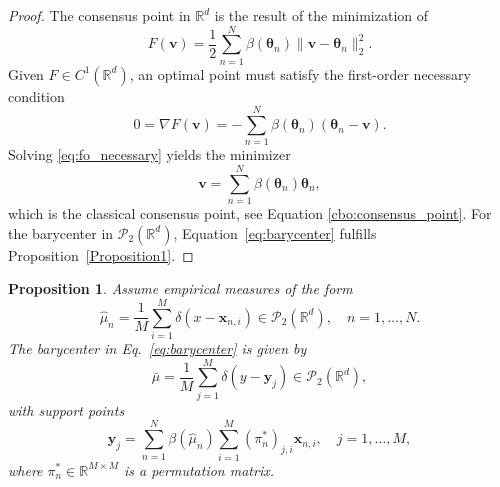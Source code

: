 \documentclass[a4paper, 11pt]{article}
\newcommand{\R}{\mathbb{R}}
\newcommand{\hmu}{\hat{\mu}_{n}}
\theoremstyle{plain} %
\newtheorem{proposition}{Proposition}
\begin{document}
	\begin{proof}
	The consensus point in $ \R^{d} $ is the result of the minimization of 
		\begin{equation}
			F \left( \bm{v} \right) = \frac{1}{2}\sum_{n=1}^{N}\beta \left( \bm{\theta}_{n} \right) \|\bm{v} - \bm{\theta}_{n} \|_{2}^{2}. 
		\end{equation}
		Given $ F \in C^{1}\left( \R^{d} \right)  $, an optimal point must satisfy the first-order necessary condition
		\begin{equation}\label{eq:fo_necessary}
			0 = \nabla F\left( \bm{v} \right) = - \sum_{n=1}^{N}\beta \left( \bm{\theta}_{n} \right)\left( \bm{\theta}_{n} - \bm{v} \right).
		\end{equation}
		Solving \eqref{eq:fo_necessary} yields the minimizer
		\begin{equation}\label{eq:consensus_linear_form}
			\bm{v}= \sum_{n=1}^{N} \beta \left( \bm{\theta}_{n} \right) \bm{\theta}_{n},
		\end{equation}
		which is the classical consensus point, see Equation \eqref{cbo:consensus_point}. For the barycenter in $ \mathcal{P}_{2}(\R^{d}) $, Equation~\eqref{eq:barycenter} fulfills Proposition~\ref{Proposition1}.
	\end{proof}
  
	\begin{proposition}
		Assume empirical measures of the form
		\begin{equation}
			\hat{\mu}_{n} =  \frac{1}{M}\sum_{i=1}^{M}\delta \left( x - \bm{x}_{n,i} \right) \in \mathcal{P}_{2}(\R^{d}),\quad n=1,\dots,N.
		\end{equation} 
		The barycenter in Eq.~\eqref{eq:barycenter} is given by
		\begin{equation}
			\bar{\mu} =  \frac{1}{M}\sum_{j=1}^{M}\delta \left( y - \bm{y}_{j} \right) \in \mathcal{P}_{2}(\R^{d}),
		\end{equation}
		with support points
		\begin{equation}
		\bm{y}_{j} = \sum_{n=1}^{N}\beta(\hmu)\sum_{i=1}^{M}\left(\pi^{*}_{n}\right)_{j,i}\bm{x}_{n,i},\quad j=1, \dots, M, 
		\end{equation}
		where $ \pi^{*}_{n} \in \R^{M \times M}$ is a permutation matrix.  
	\end{proposition} 
\end{document}
